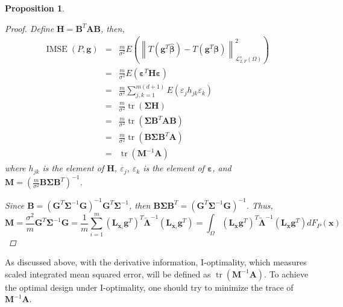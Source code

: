 \documentclass[preprint,12pt]{elsarticle}
\newtheorem{pro}{Proposition}
\DeclareMathOperator{\tr}{tr} \DeclareMathOperator{\err}{err}
\DeclareMathOperator{\IMSE}{IMSE}
\begin{document}
\begin{pro}
\begin{proof}
Define
$\boldsymbol{H}=\boldsymbol{B}^T\boldsymbol{A}\boldsymbol{B}$, then,
\begin{eqnarray*}
\IMSE(P,\boldsymbol{g})&=&\frac{m}{\sigma^2}E\left(\left\|T
\left(\boldsymbol{g}^T \hat{\boldsymbol{\beta}}\right)-T
\left(\boldsymbol{g}^T
\boldsymbol{\beta}\right)\right\|_{\mathcal{L}_{2,F}^s(\Omega)}^2\right)\\
&=&
\frac{m}{\sigma^2}E\left(\boldsymbol{\varepsilon}^T\boldsymbol{H}\boldsymbol{\varepsilon}\right)\\
&=&
\frac{m}{\sigma^2}\sum_{j,k=1}^{m(d+1)}E\left(\varepsilon_jh_{jk}\varepsilon_k\right)\\
&=& \frac{m}{\sigma^2}\tr(\boldsymbol{\Sigma}\boldsymbol{H})\\
&=&
\frac{m}{\sigma^2}\tr(\boldsymbol{\Sigma}\boldsymbol{B}^T\boldsymbol{A}\boldsymbol{B})\\
&=&
\frac{m}{\sigma^2}\tr(\boldsymbol{B}\boldsymbol{\Sigma}\boldsymbol{B}^T\boldsymbol{A})\\
&=& \tr(\boldsymbol{M}^{-1}\boldsymbol{A})
\end{eqnarray*}
where $h_{jk}$ is the element of $\boldsymbol{H}$, $\varepsilon_j$,
$\varepsilon_k$ is the element of $\boldsymbol{\varepsilon}$, and
$\boldsymbol{M}=\left(\frac{m}{\sigma^2}\boldsymbol{B}\boldsymbol{\Sigma}\boldsymbol{B}^T\right)^{-1}$.

Since
$\boldsymbol{B}=\left(\boldsymbol{G}^T\boldsymbol{\Sigma}^{-1}\boldsymbol{G}\right)^{-1}\boldsymbol{G}^T\boldsymbol{\Sigma}^{-1}$,
then
$\boldsymbol{B}\boldsymbol{\Sigma}\boldsymbol{B}^T=\left(\boldsymbol{G}^T\boldsymbol{\Sigma}^{-1}\boldsymbol{G}\right)^{-1}$.
Thus,
$$\boldsymbol{M}=\frac{\sigma^2}{m}\boldsymbol{G}^T\boldsymbol{\Sigma}^{-1}\boldsymbol{G}=\frac{1}{m}\sum_{i=1}^m(\mathbf{L}_{\boldsymbol{x}_i}\boldsymbol{g}^T)^T\widetilde{\boldsymbol{\Lambda}}^{-1}(\mathbf{L}_{\boldsymbol{x}_i}\boldsymbol{g}^T)=\int_{\Omega}(\mathbf{L}_{\boldsymbol{x}}\boldsymbol{g}^T)^T\widetilde{\boldsymbol{\Lambda}}^{-1}(\mathbf{L}_{\boldsymbol{x}}\boldsymbol{g}^T)dF_P(\boldsymbol{x})$$

\end{proof}
\end{pro}

As discussed above, with the derivative information, I-optimality,
which measures scaled integrated mean squared error, will be defined
as $\tr\left(\boldsymbol{M}^{-1}\boldsymbol{A}\right)$. To achieve
the optimal design under I-optimality, one should try to minimize
the trace of $\boldsymbol{M}^{-1}\boldsymbol{A}$.
\end{document}
